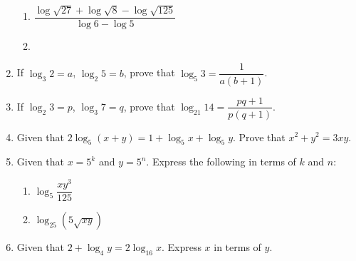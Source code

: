 \documentclass[12pt]{report}
\begin{document}
\begin{enumerate}
\begin{enumerate}
              \item ${\dfrac{\log{\sqrt{27}}+\log{\sqrt{8}}-\log{\sqrt{125}}}{\log6-\log5}}$
              \item {}
          \end{enumerate}

    \item If $\log_3 2 = a$, $\log_2 5 = b$, prove that $\log_5 3 = \dfrac{1}{a(b+1)}$.
    \item If $\log_2 3 = p$, $\log_3 7 = q$, prove that $\log_21 14 =
              \dfrac{pq+1}{p(q+1)}$.
    \item Given that $2\log_5(x+y) = 1 + \log_5 x + \log_5 y$. Prove that $x^2 + y^2 =
              3xy$.
    \item Given that $x = 5^k$ and $y = 5^n$. Express the following in terms of $k$ and
          $n$:
          \begin{enumerate}
              \item $\log_{5}{\dfrac{xy^3}{125}}$
              \item $\log_{25}\left(5{\sqrt{xy}}\right)$
          \end{enumerate}

    \item Given that $2 + \log_4 y = 2\log_16 x$. Express $x$ in terms of $y$.


\end{enumerate}
\end{document}
